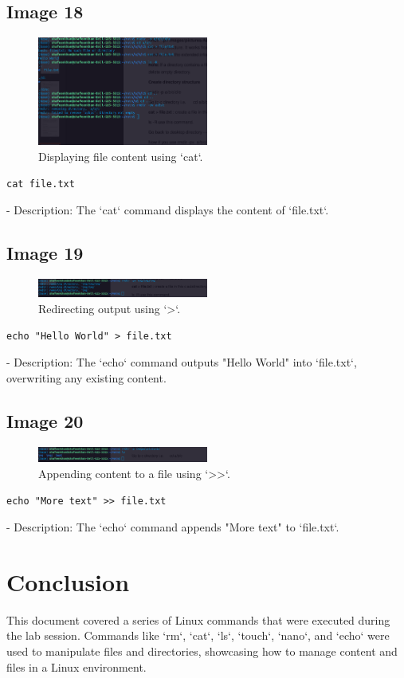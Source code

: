 \documentclass[12pt]{article}
\begin{document}
\subsection*{Image 18}
\begin{figure}[h!]
    \centering
    \includegraphics[width=0.5\textwidth]{18.png}
    \caption{Displaying file content using `cat`.}
\end{figure}
\begin{lstlisting}
cat file.txt
\end{lstlisting}
- Description: The `cat` command displays the content of `file.txt`.

\subsection*{Image 19}
\begin{figure}[h!]
    \centering
    \includegraphics[width=0.5\textwidth]{19.png}
    \caption{Redirecting output using `>`.}
\end{figure}
\begin{lstlisting}
echo "Hello World" > file.txt
\end{lstlisting}
- Description: The `echo` command outputs "Hello World" into `file.txt`, overwriting any existing content.

\subsection*{Image 20}
\begin{figure}[h!]
    \centering
    \includegraphics[width=0.5\textwidth]{20.png}
    \caption{Appending content to a file using `>>`.}
\end{figure}
\begin{lstlisting}
echo "More text" >> file.txt
\end{lstlisting}
- Description: The `echo` command appends "More text" to `file.txt`.
\section*{Conclusion}
This document covered a series of Linux commands that were executed during the lab session. Commands like `rm`, `cat`, `ls`, `touch`, `nano`, and `echo` were used to manipulate files and directories, showcasing how to manage content and files in a Linux environment.
\end{document}
